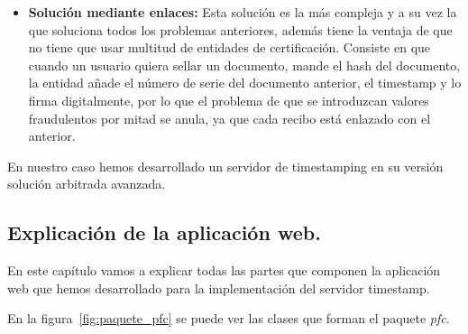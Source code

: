 \begin{itemize}
\item \textbf{Solución mediante enlaces:} Esta solución es la más compleja y a su vez la que soluciona todos los problemas anteriores, además tiene la ventaja de que no tiene que usar multitud de entidades de certificación. Consiste en que cuando un usuario quiera sellar un documento, mande el hash del documento, la entidad añade el número de serie del documento anterior, el timestamp y lo firma digitalmente, por lo que el problema de que se introduzcan valores fraudulentos por mitad se anula, ya que cada recibo está enlazado con el anterior.
\end{itemize}

En nuestro caso hemos desarrollado un servidor de timestamping en su versión solución arbitrada avanzada.


\subsection{Explicación de la aplicación web.}
En este capítulo vamos a explicar todas las partes que componen la aplicación web que hemos desarrollado para la implementación del servidor timestamp.

En la figura~\ref{fig:paquete_pfc} se puede ver las clases que forman el paquete \textit{pfc}.


